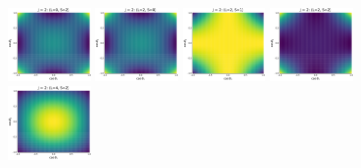 \documentclass[prd,preprintnumbers,floatfix,
nofootinbib,superscriptaddress]{revtex4}
\begin{document}
\begin{figure}
  \includegraphics[width=0.195\textwidth]{../plots/map_JLS_202.pdf}
  \includegraphics[width=0.195\textwidth]{../plots/map_JLS_220.pdf}
  \includegraphics[width=0.195\textwidth]{../plots/map_JLS_221.pdf}
  \includegraphics[width=0.195\textwidth]{../plots/map_JLS_222.pdf}
  \includegraphics[width=0.195\textwidth]{../plots/map_JLS_242.pdf}
  \caption{}
  \label{fig.j2}
\end{figure}


\end{document}
